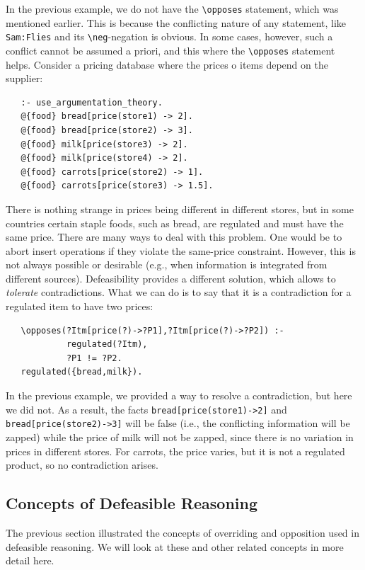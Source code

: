 \documentclass[11pt]{article}
\newcommand{\ERGO}{\mbox{\smaller{\ensuremath{\cal{E}}\smaller{{\sc{RGO}}}}}\xspace}
\newcommand{\FLSYSTEM}{\ERGO}
\newcommand{\bs}{\textbackslash}
\newcommand{\RULELOGNEG}{{\texttt{{\bs}neg}}\xspace}
\begin{document}
In the previous example, we do not have the \texttt{\bs{}opposes}
statement, which was mentioned earlier. This is because the conflicting
nature of any statement, like \texttt{Sam:Flies} and its
\texttt{\RULELOGNEG}-negation is obvious. In some cases, however, such a
conflict cannot be assumed a priori, and this where the
\texttt{\bs{}opposes} statement helps.
Consider a pricing database where the prices o items depend on the supplier:
\begin{verbatim}
   :- use_argumentation_theory.
   @{food} bread[price(store1) -> 2].
   @{food} bread[price(store2) -> 3].
   @{food} milk[price(store3) -> 2].
   @{food} milk[price(store4) -> 2].
   @{food} carrots[price(store2) -> 1].
   @{food} carrots[price(store3) -> 1.5].
\end{verbatim}
There is nothing strange in prices being different in different stores, but
in some countries certain staple foods, such as bread, are regulated and
must have the same price. There are many ways to deal with this problem.
One would be to abort insert operations if they violate the same-price
constraint. However, this is not always possible or desirable (e.g., when
information is integrated from different sources). Defeasibility provides a
different solution, which allows \FLSYSTEM to \emph{tolerate} contradictions.
What we can do is to say that it is a contradiction for
a regulated item to have two prices:
\begin{verbatim}
   \opposes(?Itm[price(?)->?P1],?Itm[price(?)->?P2]) :-
            regulated(?Itm),
            ?P1 != ?P2.
   regulated({bread,milk}).
\end{verbatim}
In the previous example, we provided a way to resolve a contradiction, but
here we did not. As a result, the facts \texttt{bread[price(store1)->2]} and
\texttt{bread[price(store2)->3]} will be false (i.e., the conflicting
information will be zapped) while the price of milk will not be zapped,
since there is no variation in prices in different stores. For
carrots, the price varies, but it is not a regulated product, so no
contradiction arises.

\subsection{Concepts of Defeasible Reasoning}

The previous section illustrated the concepts of overriding and opposition
used in defeasible reasoning. We will look at these and other related
concepts in more detail here.
\end{document}
